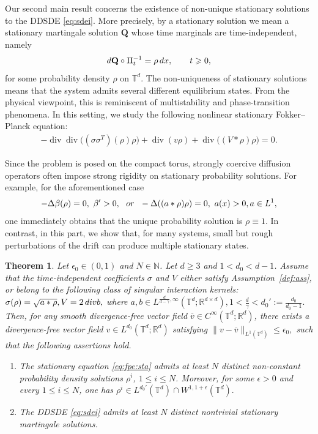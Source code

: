 \documentclass[10pt,a4paper]{amsart}
\numberwithin{equation}{section}
\newtheorem{theorem}{Theorem}[section]
\def\dif{{\mathord{{\rm d}}}}
\def\geq{\geqslant}
\def\leq{\leqslant}
\def\div{\mathord{{\rm div}}}
\def\dif{{\mathord{{\rm d}}}}
\def\geq{\geqslant}
\def\leq{\leqslant}
\def\div{\mathord{{\rm div}}}
\begin{document}
Our second main result concerns the existence of non-unique stationary
solutions to the DDSDE \eqref{eq:sdei}. More precisely, by a stationary
solution we mean a stationary martingale solution $\mathbf Q$ whose  time
marginals are time-independent, namely
\begin{align*}
\dif\mathbf Q\circ \Pi_t^{-1} =\rho\,\dif x,
\qquad
t\geq 0,
\end{align*}
for some probability density $\rho$ on $\mathbb{T}^d$.
The non-uniqueness of stationary solutions means that the system admits several
different equilibrium states. From the physical viewpoint, this is reminiscent
of multistability and phase-transition phenomena.
In this setting, we study the following nonlinear stationary Fokker--Planck
equation:
\begin{align}
-\operatorname{div}\operatorname{div}
\bigl(
(\sigma\sigma^T)(\rho)\rho
\bigr)
+
\operatorname{div}(v\rho)
+
\operatorname{div}\bigl((V*\rho)\rho\bigr)
=
0.
\label{eq:fpe:sta}
\end{align}

Since the problem is posed on the compact torus, strongly coercive diffusion
operators often impose strong rigidity on stationary probability solutions.
For example, for the aforementioned case
\begin{align*}
-\Delta\beta(\rho)=0,\ 
\beta'>0, \ \ {\rm or}\  \ 
-\Delta(
(a*\rho) \rho
)
=
0,\ a(x)>0,a\in L^1,
\end{align*}
one immediately obtains that  the unique
probability solution is $\rho\equiv 1$.  
In contrast, in this part, we show that, for many systems, small but rough perturbations of
the drift can produce multiple stationary states.


\begin{theorem}\label{thm:sta}
Let $\epsilon_0\in(0,1)$ and $N\in\mathbb{N}$. Let $d\geq 3$ and
$1<d_0<d-1$. Assume that the time-independent coefficients $\sigma$ and $V$
either satisfy Assumption~\ref{def:ass}, or belong to the following class of
singular interaction kernels:
$
\sigma(\rho)=\sqrt{a*\rho},
V=2\,\div b,
$
where $
a,b\in
L^{\frac{d}{d-\gamma},\infty}
(\mathbb{T}^d;\mathbb{R}^{d\times d}),
1<\frac{d}{\gamma}<d_0':=\frac{d_0}{d_0-1}.
$ 
Then, for any smooth divergence-free vector field
$\overline v\in C^\infty(\mathbb{T}^d;\mathbb{R}^d)$, there exists a
divergence-free vector field
$
v\in L^{d_0}(\mathbb{T}^d;\mathbb{R}^d)
$
satisfying $\|v-\overline v\|_{L^1(\mathbb{T}^d)}
\leq
\epsilon_0,$ 
such that the following assertions hold.

\begin{enumerate}
\item
The stationary equation \eqref{eq:fpe:sta} admits at least $N$ distinct
non-constant probability density solutions $\rho^i$, $1\leq i\leq N$.
Moreover, for some $\epsilon>0$ and every $1\leq i\leq N$, one has
$
\rho^i
\in
L^{d_0'}(\mathbb{T}^d)
\cap
W^{1,1+\epsilon}(\mathbb{T}^d).
$

\item
The DDSDE \eqref{eq:sdei} admits at least $N$ distinct nontrivial stationary
martingale solutions.  
\end{enumerate}
\end{theorem}
\end{document}
